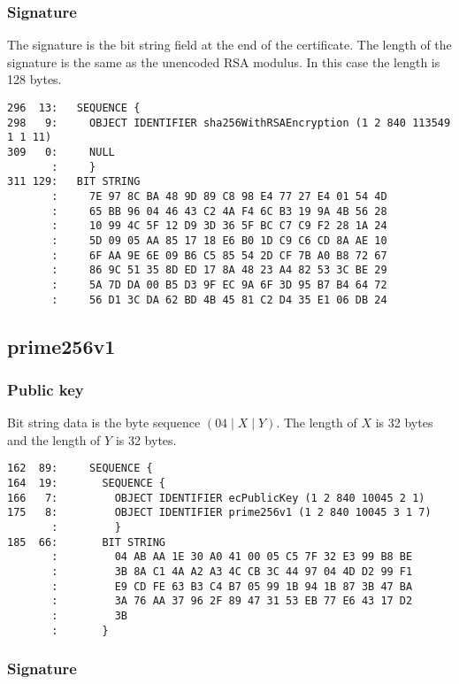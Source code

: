 \documentclass[12pt]{article}
\begin{document}
\subsubsection{Signature}

\noindent
The signature is the bit string field at the end of the certificate.
The length of the signature is the same as the unencoded RSA modulus.
In this case the length is 128 bytes.

\begin{verbatim}
296  13:   SEQUENCE {
298   9:     OBJECT IDENTIFIER sha256WithRSAEncryption (1 2 840 113549 1 1 11)
309   0:     NULL
       :     }
311 129:   BIT STRING
       :     7E 97 8C BA 48 9D 89 C8 98 E4 77 27 E4 01 54 4D
       :     65 BB 96 04 46 43 C2 4A F4 6C B3 19 9A 4B 56 28
       :     10 99 4C 5F 12 D9 3D 36 5F BC C7 C9 F2 28 1A 24
       :     5D 09 05 AA 85 17 18 E6 B0 1D C9 C6 CD 8A AE 10
       :     6F AA 9E 6E 09 B6 C5 85 54 2D CF 7B A0 B8 72 67
       :     86 9C 51 35 8D ED 17 8A 48 23 A4 82 53 3C BE 29
       :     5A 7D DA 00 B5 D3 9F EC 9A 6F 3D 95 B7 B4 64 72
       :     56 D1 3C DA 62 BD 4B 45 81 C2 D4 35 E1 06 DB 24
\end{verbatim}

\newpage
\subsection{prime256v1}

\subsubsection{Public key}

\noindent
Bit string data is the byte sequence $(04\mid X\mid Y)$.
The length of $X$ is 32 bytes and the length of $Y$ is 32 bytes.

\begin{verbatim}
162  89:     SEQUENCE {
164  19:       SEQUENCE {
166   7:         OBJECT IDENTIFIER ecPublicKey (1 2 840 10045 2 1)
175   8:         OBJECT IDENTIFIER prime256v1 (1 2 840 10045 3 1 7)
       :         }
185  66:       BIT STRING
       :         04 AB AA 1E 30 A0 41 00 05 C5 7F 32 E3 99 B8 BE
       :         3B 8A C1 4A A2 A3 4C CB 3C 44 97 04 4D D2 99 F1
       :         E9 CD FE 63 B3 C4 B7 05 99 1B 94 1B 87 3B 47 BA
       :         3A 76 AA 37 96 2F 89 47 31 53 EB 77 E6 43 17 D2
       :         3B
       :       }
\end{verbatim}

\subsubsection{Signature}
\end{document}
